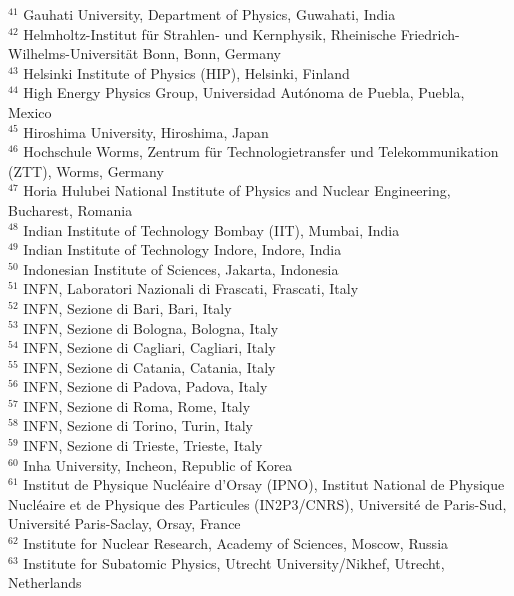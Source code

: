 \begin{flushleft}
$^{41}$ Gauhati University, Department of Physics, Guwahati, India\\
$^{42}$ Helmholtz-Institut f\"{u}r Strahlen- und Kernphysik, Rheinische Friedrich-Wilhelms-Universit\"{a}t Bonn, Bonn, Germany\\
$^{43}$ Helsinki Institute of Physics (HIP), Helsinki, Finland\\
$^{44}$ High Energy Physics Group,  Universidad Aut\'{o}noma de Puebla, Puebla, Mexico\\
$^{45}$ Hiroshima University, Hiroshima, Japan\\
$^{46}$ Hochschule Worms, Zentrum  f\"{u}r Technologietransfer und Telekommunikation (ZTT), Worms, Germany\\
$^{47}$ Horia Hulubei National Institute of Physics and Nuclear Engineering, Bucharest, Romania\\
$^{48}$ Indian Institute of Technology Bombay (IIT), Mumbai, India\\
$^{49}$ Indian Institute of Technology Indore, Indore, India\\
$^{50}$ Indonesian Institute of Sciences, Jakarta, Indonesia\\
$^{51}$ INFN, Laboratori Nazionali di Frascati, Frascati, Italy\\
$^{52}$ INFN, Sezione di Bari, Bari, Italy\\
$^{53}$ INFN, Sezione di Bologna, Bologna, Italy\\
$^{54}$ INFN, Sezione di Cagliari, Cagliari, Italy\\
$^{55}$ INFN, Sezione di Catania, Catania, Italy\\
$^{56}$ INFN, Sezione di Padova, Padova, Italy\\
$^{57}$ INFN, Sezione di Roma, Rome, Italy\\
$^{58}$ INFN, Sezione di Torino, Turin, Italy\\
$^{59}$ INFN, Sezione di Trieste, Trieste, Italy\\
$^{60}$ Inha University, Incheon, Republic of Korea\\
$^{61}$ Institut de Physique Nucl\'{e}aire d'Orsay (IPNO), Institut National de Physique Nucl\'{e}aire et de Physique des Particules (IN2P3/CNRS), Universit\'{e} de Paris-Sud, Universit\'{e} Paris-Saclay, Orsay, France\\
$^{62}$ Institute for Nuclear Research, Academy of Sciences, Moscow, Russia\\
$^{63}$ Institute for Subatomic Physics, Utrecht University/Nikhef, Utrecht, Netherlands\\

\end{flushleft}
